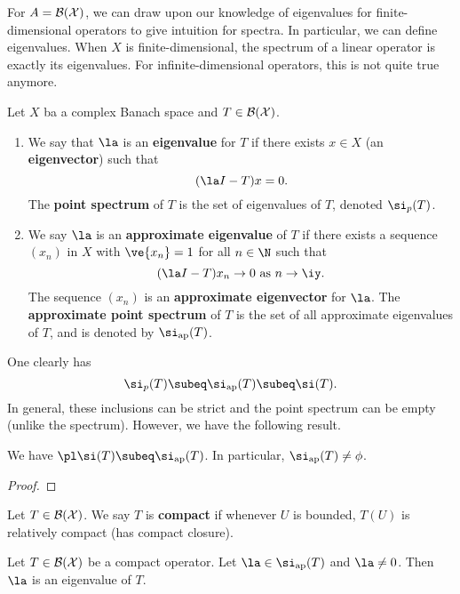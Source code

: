 For $A=\cal B(X)$, we can draw upon our knowledge of eigenvalues for finite-dimensional operators to give intuition for spectra. In particular, we can define eigenvalues. When $X$ is finite-dimensional, the spectrum of a linear operator is exactly its eigenvalues. For infinite-dimensional operators, this is not quite true anymore.
\begin{df}
Let $X$ ba a complex Banach space and $T\in \cal B(X)$. 
\begin{enumerate}
\item
We say that $\la$ is an \textbf{eigenvalue} for $T$ if there exists $x\in X$ (an \textbf{eigenvector}) such that 
\[
(\la I-T)x=0.
\]
The \textbf{point spectrum} of $T$ is the set of eigenvalues of $T$, denoted $\si_p(T)$.
\item
We say $\la$ is an \textbf{approximate eigenvalue} of $T$ if there exists a sequence $(x_n)$ in $X$ with $\ve{x_n}=1$ for all $n\in \N$ such that
\[
(\la I-T)x_n\to 0\text{ as } n\to \iy.
\]
The sequence $(x_n)$ is an \textbf{approximate eigenvector} for $\la$. The \textbf{approximate point spectrum} of $T$ is the set of all approximate eigenvalues of $T$, and is denoted by $\si_{\text{ap}}(T)$.
\end{enumerate}
\end{df}
One clearly has
\[
\si_p(T)\subeq \si_{\text{ap}}(T)\subeq \si(T).
\]
In general, these inclusions can be strict and the point spectrum can be empty (unlike the spectrum). However, we have the following result. 
\begin{thm}
We have $\pl \si(T)\subeq \si_{\text{ap}}(T)$. In particular, $\si_{\text{ap}}(T)\ne \phi$.
\end{thm}
\begin{proof}
\end{proof}
\begin{df}
Let $T\in \cal B(X)$. We say $T$ is \textbf{compact} if whenever $U$ is bounded, $T(U)$ is relatively compact (has compact closure).
\end{df}
\begin{thm}
Let $T\in \cal B(X)$ be a compact operator. Let $\la \in \si_{\text{ap}}(T)$ and $\la\ne 0$. Then $\la$ is an eigenvalue of $T$.
\end{thm}